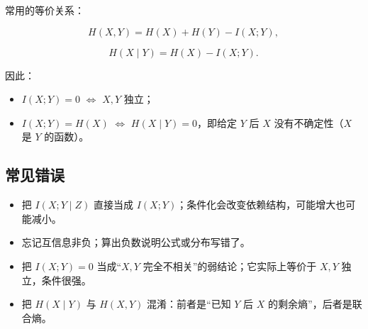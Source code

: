 常用的等价关系：

\[
H(X,Y)=H(X)+H(Y)-I(X;Y),
\]

\[
H(X\mid Y)=H(X)-I(X;Y).
\]

因此：

\begin{itemize}
\item $I(X;Y)=0$ $\iff$ $X,Y$ 独立；
\item $I(X;Y)=H(X)$ $\iff$ $H(X\mid Y)=0$，即给定 $Y$ 后 $X$ 没有不确定性（$X$ 是 $Y$ 的函数）。
\end{itemize}


\subsection{常见错误}


\begin{itemize}
\item 把 $I(X;Y\mid Z)$ 直接当成 $I(X;Y)$；条件化会改变依赖结构，可能增大也可能减小。
\item 忘记互信息非负；算出负数说明公式或分布写错了。
\item 把 $I(X;Y)=0$ 当成“$X,Y$ 完全不相关”的弱结论；它实际上等价于 $X,Y$ 独立，条件很强。
\item 把 $H(X\mid Y)$ 与 $H(X,Y)$ 混淆：前者是“已知 $Y$ 后 $X$ 的剩余熵”，后者是联合熵。
\end{itemize}
